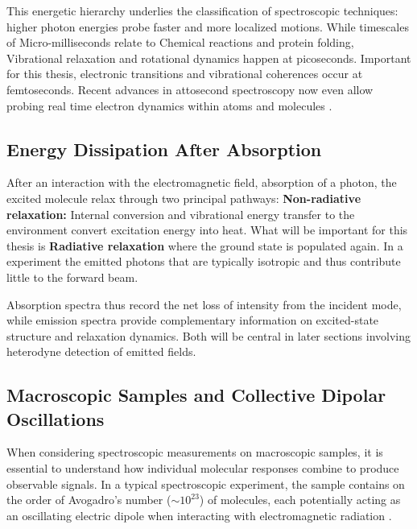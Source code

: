 \noindent
This energetic hierarchy underlies the classification of spectroscopic techniques: higher photon energies probe faster and more localized motions.
While timescales of Micro-milliseconds relate to  Chemical reactions and protein folding, Vibrational relaxation and rotational dynamics happen at picoseconds. Important for this thesis, electronic transitions and vibrational coherences occur at femtoseconds. Recent advances in attosecond spectroscopy now even allow probing real time electron dynamics within atoms and molecules \cite{rupprechtetal2025tracinglonglivedatomic}.

\subsection{Energy Dissipation After Absorption}

\noindent
After an interaction with the electromagnetic field, absorption of a photon, the excited molecule relax through two principal pathways:
\textbf{Non-radiative relaxation:} Internal conversion and vibrational energy transfer to the environment convert excitation energy into heat. What will be important for this thesis is \textbf{Radiative relaxation} where the ground state is populated again. In a experiment the emitted photons that are typically isotropic and thus contribute little to the forward beam.

\noindent
Absorption spectra thus record the net loss of intensity from the incident mode, while emission spectra provide complementary information on excited-state structure and relaxation dynamics. Both will be central in later sections involving heterodyne detection of emitted fields. 



\subsection{Macroscopic Samples and Collective Dipolar Oscillations}
\label{subsec:macroscopic_samples}

\noindent 
When considering spectroscopic measurements on macroscopic samples, it is essential to understand how individual molecular responses combine to produce observable signals. In a typical spectroscopic experiment, the sample contains on the order of Avogadro's number ($\sim 10^{23}$) of molecules, each potentially acting as an oscillating electric dipole when interacting with electromagnetic radiation \cite{feynman1965feynmanlecturesphysics}.

